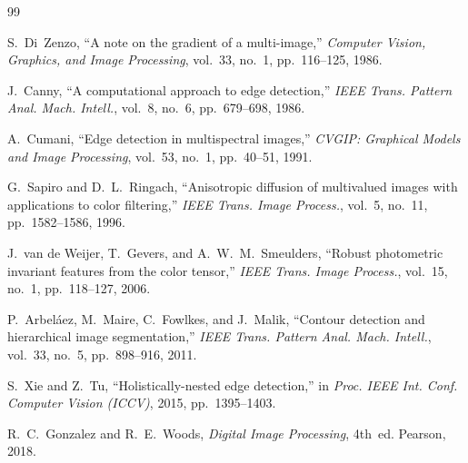 \documentclass[11pt,a4paper]{article}
\theoremstyle{plain}
\theoremstyle{definition}
\begin{document}
\begin{thebibliography}{99}

S.~Di~Zenzo,
``A note on the gradient of a multi-image,''
\emph{Computer Vision, Graphics, and Image Processing},
vol.~33, no.~1, pp.~116--125, 1986.

J.~Canny,
``A computational approach to edge detection,''
\emph{IEEE Trans. Pattern Anal. Mach. Intell.},
vol.~8, no.~6, pp.~679--698, 1986.

A.~Cumani,
``Edge detection in multispectral images,''
\emph{CVGIP: Graphical Models and Image Processing},
vol.~53, no.~1, pp.~40--51, 1991.

G.~Sapiro and D.~L.~Ringach,
``Anisotropic diffusion of multivalued images with applications to color
filtering,''
\emph{IEEE Trans. Image Process.},
vol.~5, no.~11, pp.~1582--1586, 1996.

J.~van de Weijer, T.~Gevers, and A.~W.~M.~Smeulders,
``Robust photometric invariant features from the color tensor,''
\emph{IEEE Trans. Image Process.},
vol.~15, no.~1, pp.~118--127, 2006.

P.~Arbel\'aez, M.~Maire, C.~Fowlkes, and J.~Malik,
``Contour detection and hierarchical image segmentation,''
\emph{IEEE Trans. Pattern Anal. Mach. Intell.},
vol.~33, no.~5, pp.~898--916, 2011.

S.~Xie and Z.~Tu,
``Holistically-nested edge detection,''
in \emph{Proc. IEEE Int. Conf. Computer Vision (ICCV)}, 2015, pp.~1395--1403.

R.~C.~Gonzalez and R.~E.~Woods,
\emph{Digital Image Processing}, 4th~ed.
Pearson, 2018.


\end{thebibliography}
\end{document}
